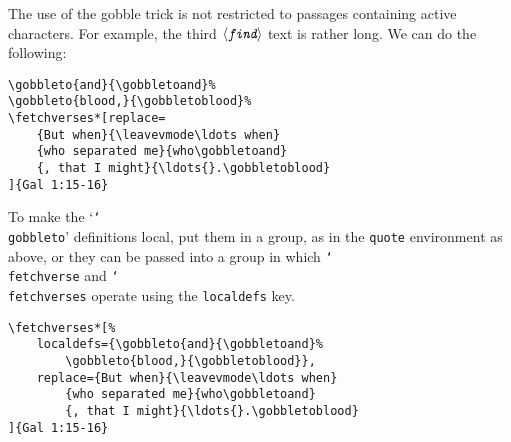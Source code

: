 \documentclass{article}
\providecommand\cs[1]{\texttt{\char`\\#1}}
\def\ameta#1{$\langle\textit{\texttt{#1}}\rangle$}
\begin{document}
\medskip
The use of the gobble trick is not restricted to passages containing active
characters. For example, the third \ameta{find} text is rather long. We can do the
following:
\begin{Verbatim}[xleftmargin=\leftmargini]
\gobbleto{and}{\gobbletoand}%
\gobbleto{blood,}{\gobbletoblood}%
\fetchverses*[replace=
    {But when}{\leavevmode\ldots when}
    {who separated me}{who\gobbletoand}
    {, that I might}{\ldots{}.\gobbletoblood}
]{Gal 1:15-16}
\end{Verbatim}
\begin{quote}\eSQ
{}
\end{quote}

To make the `\cs{gobbleto}' definitions local, put them in a group, as in the \texttt{quote} environment as above, or
they can be passed into a group in which \cs{fetchverse} and \cs{fetchverses} operate using the \texttt{localdefs} key.
\begin{Verbatim}[xleftmargin=\leftmargini,fontsize=\small]
\fetchverses*[%
    localdefs={\gobbleto{and}{\gobbletoand}%
        \gobbleto{blood,}{\gobbletoblood}},
    replace={But when}{\leavevmode\ldots when}
        {who separated me}{who\gobbletoand}
        {, that I might}{\ldots{}.\gobbletoblood}
]{Gal 1:15-16}
\end{Verbatim}
\eSQ
{}
\end{document}
